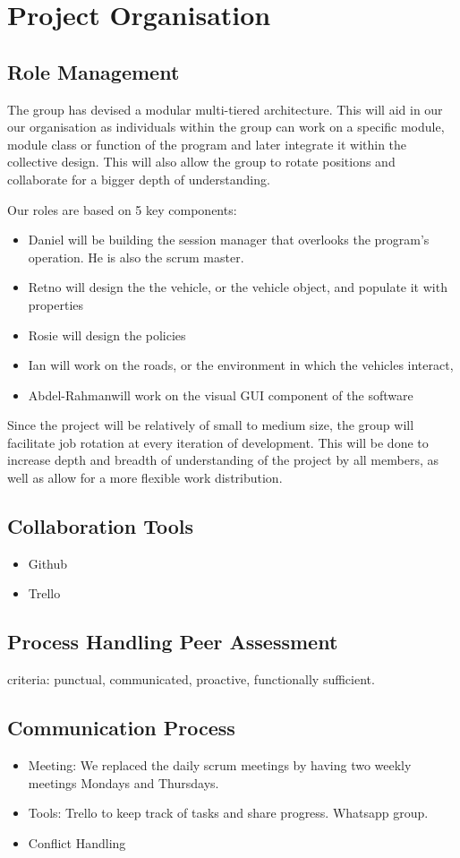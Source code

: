 \documentclass[11pt]{article}
\begin{document}
\section{Project Organisation}
\subsection{Role Management}
The group has devised a modular multi-tiered architecture. This will aid in our our organisation as individuals within the group can work on a specific module, module class or function of the program and later integrate it within the collective design. This will also allow the group to rotate positions and collaborate for a bigger depth of understanding.

Our roles are based on 5 key components:
\begin{itemize}
\item Daniel will be building the session manager that overlooks the program’s operation. He is also the scrum master.
\item Retno will design the the vehicle, or the vehicle object, and populate it with properties
\item Rosie will design the policies
\item Ian will work on the roads, or the environment in which the vehicles interact,
\item Abdel-Rahmanwill work on the visual GUI component of the software
\end{itemize}

Since the project will be relatively of small to medium size, the group will facilitate job rotation at every iteration of development. This will be done to increase depth and breadth of understanding of the project by all members, as well as allow for a more flexible work distribution. 

\subsection{Collaboration Tools}
\begin{itemize}
	\item Github
	\item Trello
\end{itemize}
\subsection{Process Handling Peer Assessment}
criteria: punctual, communicated, proactive, functionally sufficient. 
\subsection{Communication Process}
\begin{itemize}
	\item Meeting: We replaced the daily scrum meetings by having two weekly meetings Mondays and Thursdays.
	\item Tools: Trello to keep track of tasks and share progress. Whatsapp group.
	\item Conflict Handling
\end{itemize}
\end{document}
